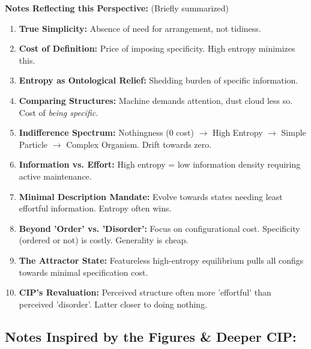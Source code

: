 \documentclass[11pt, a4paper]{article}
\begin{document}
\textbf{Notes Reflecting this Perspective:} (Briefly summarized)
\begin{enumerate} \itemsep0em
    \item \textbf{True Simplicity:} Absence of need for arrangement, not tidiness.
    \item \textbf{Cost of Definition:} Price of imposing specificity. High entropy minimizes this.
    \item \textbf{Entropy as Ontological Relief:} Shedding burden of specific information.
    \item \textbf{Comparing Structures:} Machine demands attention, dust cloud less so. Cost of \textit{being specific}.
    \item \textbf{Indifference Spectrum:} Nothingness (0 cost) $\to$ High Entropy $\to$ Simple Particle $\to$ Complex Organism. Drift towards zero.
    \item \textbf{Information vs. Effort:} High entropy = low information density requiring active maintenance.
    \item \textbf{Minimal Description Mandate:} Evolve towards states needing least effortful information. Entropy often wins.
    \item \textbf{Beyond 'Order' vs. 'Disorder':} Focus on configurational cost. Specificity (ordered or not) is costly. Generality is cheap.
    \item \textbf{The Attractor State:} Featureless high-entropy equilibrium pulls all configs towards minimal specification cost.
    \item \textbf{CIP's Revaluation:} Perceived structure often more 'effortful' than perceived 'disorder'. Latter closer to doing nothing.
\end{enumerate}

\subsection{Notes Inspired by the Figures \& Deeper CIP:}
\end{document}
